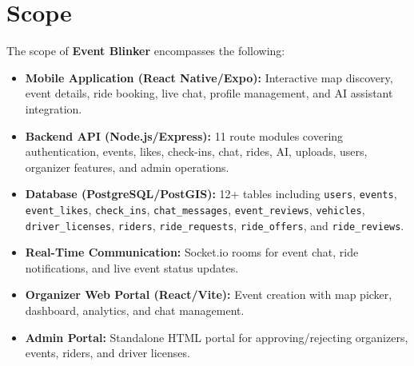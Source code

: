 \section{Scope}
The scope of \textbf{Event Blinker} encompasses the following:
\begin{itemize}
    \item \textbf{Mobile Application (React Native/Expo):} Interactive map discovery, event details, ride booking, live chat, profile management, and AI assistant integration.
    \item \textbf{Backend API (Node.js/Express):} 11 route modules covering authentication, events, likes, check-ins, chat, rides, AI, uploads, users, organizer features, and admin operations.
    \item \textbf{Database (PostgreSQL/PostGIS):} 12+ tables including \texttt{users}, \texttt{events}, \texttt{event\_likes}, \texttt{check\_ins}, \texttt{chat\_messages}, \texttt{event\_reviews}, \texttt{vehicles}, \texttt{driver\_licenses}, \texttt{riders}, \texttt{ride\_requests}, \texttt{ride\_offers}, and \texttt{ride\_reviews}.
    \item \textbf{Real-Time Communication:} Socket.io rooms for event chat, ride notifications, and live event status updates.
    \item \textbf{Organizer Web Portal (React/Vite):} Event creation with map picker, dashboard, analytics, and chat management.
    \item \textbf{Admin Portal:} Standalone HTML portal for approving/rejecting organizers, events, riders, and driver licenses.
\end{itemize}
